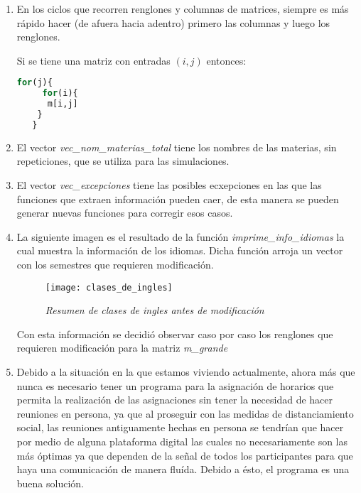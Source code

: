 \begin{appendices}
\begin{enumerate}
  \item En los ciclos que recorren renglones y columnas de matrices, siempre es más rápido hacer (de afuera hacia adentro) primero las columnas y luego los renglones.
  
  Si se tiene una matriz con entradas $(i,j)$ entonces:
  
  \begin{lstlisting}[language=R, caption= \textit{Ejemplo de ciclo for}]
	for(j){
	 for(i){
      m[i,j]
    }
   }
  \end{lstlisting}


  \item El vector \textit{vec\_nom\_materias\_total} tiene los nombres de las materias, sin repeticiones, que se utiliza para las simulaciones.
  
  \item El vector \textit{vec\_excepciones} tiene las posibles ecxepciones en las que las funciones que extraen información pueden caer, de esta manera se pueden generar nuevas funciones para corregir esos casos.
  
  \item La siguiente imagen es el resultado de la función \textit{imprime\_info\_idiomas} la cual muestra la información de los idiomas. Dicha función arroja un vector con los semestres que requieren modificación.

\begin{figure}[H]
\centering
\texttt{[image: clases\_de\_ingles]} %
\caption{\textit{Resumen de clases de ingles antes de modificación}}
\end{figure}  
  
Con esta información se decidió observar caso por caso los renglones que requieren modificación para la matriz \textit{m\_grande}


  \item Debido a la situación en la que estamos viviendo actualmente, ahora más que nunca es necesario tener un programa para la asignación de horarios que permita la realización de las asignaciones sin tener la necesidad de hacer reuniones en persona, ya que al proseguir con las medidas de distanciamiento social, las reuniones antiguamente hechas en persona se tendrían que hacer por medio de alguna plataforma digital las cuales no necesariamente son las más óptimas ya que dependen de la señal de todos los participantes para que haya una comunicación de manera fluída. Debido a ésto, el programa es una buena solución.


\end{enumerate}
\end{appendices}

